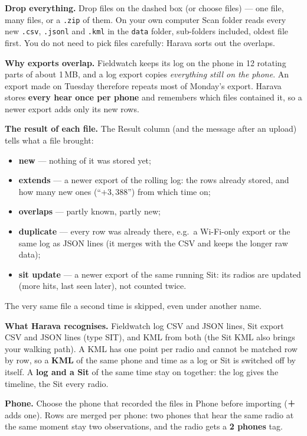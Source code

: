\documentclass[10pt,a4paper]{article}
\newcommand{\ui}[1]{\textsf{\small #1}}            %
\newcommand{\lead}[1]{\textbf{#1}\enspace}           %
\begin{document}
\lead{Drop everything.} Drop files on the dashed box (or \ui{choose files}) --- one file, many files, or a \texttt{.zip} of them. On your own computer \ui{Scan folder} reads every new \texttt{.csv}, \texttt{.jsonl} and \texttt{.kml} in the \texttt{data} folder, sub-folders included, oldest file first. You do not need to pick files carefully: Harava sorts out the overlaps.

\lead{Why exports overlap.} Fieldwatch keeps its log on the phone in 12 rotating parts of about 1\,MB, and a log export copies \emph{everything still on the phone}. An export made on Tuesday therefore repeats most of Monday's export. Harava stores \textbf{every hear once per phone} and remembers which files contained it, so a newer export adds only its new rows.

\lead{The result of each file.} The \ui{Result} column (and the message after an upload) tells what a file brought:
\begin{itemize}[leftmargin=1.2em]
\item \textbf{new} --- nothing of it was stored yet;
\item \textbf{extends} --- a newer export of the rolling log: the rows already stored, and how many new ones (``$+3{,}388$'') from which time on;
\item \textbf{overlaps} --- partly known, partly new;
\item \textbf{duplicate} --- every row was already there, e.g.\ a Wi-Fi-only export or the same log as JSON lines (it merges with the CSV and keeps the longer raw data);
\item \textbf{sit update} --- a newer export of the same running Sit: its radios are updated (more hits, last seen later), not counted twice.
\end{itemize}
The very same file a second time is skipped, even under another name.

\lead{What Harava recognises.} Fieldwatch log CSV and JSON lines, Sit export CSV and JSON lines (type \ui{SIT}), and KML from both (the Sit KML also brings your walking path). A KML has one point per radio and cannot be matched row by row, so a \textbf{KML} of the same phone and time as a log or Sit is switched off by itself. A \textbf{log and a Sit} of the same time stay on together: the log gives the timeline, the Sit every radio.

\lead{Phone.} Choose the phone that recorded the files in \ui{Phone} before importing (\ui{＋} adds one). Rows are merged per phone: two phones that hear the same radio at the same moment stay two observations, and the radio gets a \textbf{2 phones} tag.
\end{document}
